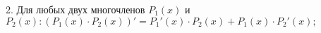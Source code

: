 2. Для любых двух многочленов $P_1(x)$ и $P_2(x): (P_1(x)\cdot P_2(x))'=P_1'(x)\cdot P_2(x)+P_1(x)\cdot P_2'(x);$\\
